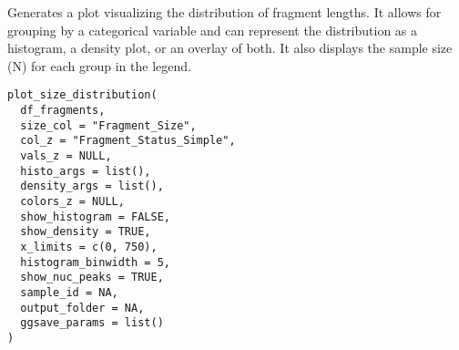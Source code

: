\documentclass[a4paper]{book}
\begin{document}
%
\begin{Description}
Generates a plot visualizing the distribution of fragment lengths. It allows for grouping by a
categorical variable and can represent the distribution as a histogram, a density plot, or an overlay of both.
It also displays the sample size (N) for each group in the legend.
\end{Description}
%
\begin{Usage}
\begin{verbatim}
plot_size_distribution(
  df_fragments,
  size_col = "Fragment_Size",
  col_z = "Fragment_Status_Simple",
  vals_z = NULL,
  histo_args = list(),
  density_args = list(),
  colors_z = NULL,
  show_histogram = FALSE,
  show_density = TRUE,
  x_limits = c(0, 750),
  histogram_binwidth = 5,
  show_nuc_peaks = TRUE,
  sample_id = NA,
  output_folder = NA,
  ggsave_params = list()
)
\end{verbatim}
\end{Usage}
%
\end{document}
